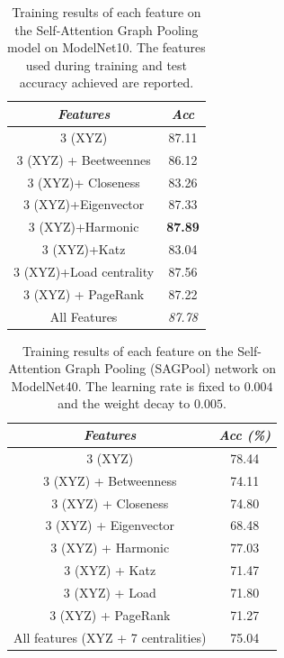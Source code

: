 \documentclass[conference]{IEEEtran}
\begin{document}
    \begin{table}[t]
    
        \caption{Training results of each feature on the Self-Attention Graph Pooling model on ModelNet10. The features used during training and test accuracy achieved are reported.}
        \begin{center}
        \begin{tabular}{|c|c|}
        \hline
          \textbf{\textit{Features}}& \textbf{\textit{Acc}} \\
        \hline
        3 (XYZ)&	87.11\\
        \hline
        3 (XYZ) + Beetweennes&	86.12   \\
        \hline
        3 (XYZ)+ Closeness&	83.26  \\
        \hline
        3 (XYZ)+Eigenvector&	87.33 \\
        \hline
        3 (XYZ)+Harmonic&	\textbf{87.89}  \\
        \hline
        3 (XYZ)+Katz&83.04   \\
        \hline
        3 (XYZ)+Load centrality&	87.56   \\
        \hline
        3 (XYZ) + PageRank&	87.22  \\
        \hline
        All Features&	\textit{87.78}   \\
        \hline
    
        \end{tabular}
        \label{tab3}
        
        \end{center}
        \end{table}

\begin{table}[t]
    \caption{Training results of each feature on the Self-Attention Graph Pooling (SAGPool) network on ModelNet40. The learning rate is fixed to $0.004$ and the weight decay to $0.005$.}
    \label{tab:sagpool_m40}
    \begin{center}
    \begin{tabular}{|c|c|}
        \hline
        \textbf{\textit{Features}} & \textbf{\textit{Acc (\%)}} \\
        \hline
        3 (XYZ) & 78.44 \\
        \hline
        3 (XYZ) + Betweenness & 74.11 \\
        \hline
        3 (XYZ) + Closeness & 74.80 \\
        \hline
        3 (XYZ) + Eigenvector & 68.48 \\
        \hline
        3 (XYZ) + Harmonic & 77.03 \\
        \hline
        3 (XYZ) + Katz & 71.47 \\
        \hline
        3 (XYZ) + Load & 71.80 \\
        \hline
        3 (XYZ) + PageRank & 71.27 \\
        \hline
        All features (XYZ + 7 centralities) & 75.04 \\
        \hline
    \end{tabular}
    \end{center}
\end{table}
\end{document}
